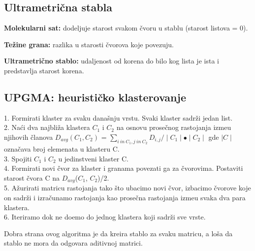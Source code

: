\subsection{Ultrametri\v{c}na stabla}
\label{subsec:us}

\begin{definicija}
\textbf{Molekularni sat:} dodeljuje starost svakom \v{c}voru u stablu (starost listova = 0).
\end{definicija}

\begin{definicija}
\textbf{Te\v{z}ine grana:} razlika u starosti \v{c}vorova koje povezuju.
\end{definicija}

\begin{definicija}
\textbf{Ultrametri\v{c}no stablo:} udaljenost od korena do bilo kog lista je ista i predstavlja starost korena.
\end{definicija}

\subsection{UPGMA: heuristi\v{c}ko klasterovanje}
\label{subsec:upgma}

\begin{tcolorbox}
1. Formirati klaster za svaku dana\v{s}nju vrstu. Svaki klaster sadr\v{z}i jedan list.\\
2. Na\'ci dva najbli\v{z}a klastera $C_1$ i $C_2$ na osnovu prose\v{c}nog rastojanja izme\dj u njihovih \v{c}lanova $D_{avg}(C_1, C_2)$ = $\sum_{i\ in\ C_1, j\ in\ C_2} D_{i, j} / \mid C_1 \mid \bullet \mid C_2 \mid $ gde $\mid C \mid$ ozna\v{c}ava broj elemenata u klasteru C.\\
3. Spojiti $C_1$ i $C_2$ u jedinstveni klaster C.\\
4. Formirati novi \v{c}vor za klaster i granama povezati ga za \v{c}vorovima. Postaviti starost \v{c}vora C na $D_{avg}$($C_1$, $C_2$)/2.\\
5. A\v{z}urirati matricu rastojanja tako \v{s}to ubacimo novi \v{c}vor, izbacimo \v{c}vorove koje on sadr\v{z}i i izra\v{c}unamo rastojanja kao prose\v{c}na rastojanja izme\dj u svaka dva para klastera.\\
6. Iteriramo dok ne do\dj emo do jednog klastera koji sadr\v{z}i sve vrste.
\end{tcolorbox}

Dobra strana ovog algoritma je da kreira stablo za svaku matricu, a lo\v{s}a da stablo ne mora da odgovara aditivnoj matrici.


